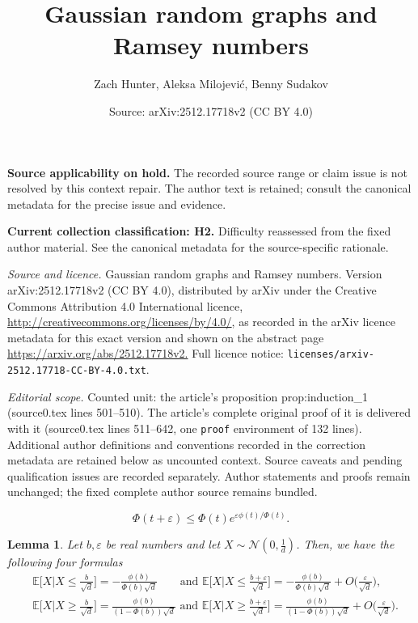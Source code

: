 \documentclass[10pt,a4paper]{amsart}
\title{\vspace{-0.9cm} Gaussian random graphs and Ramsey numbers}
\author{Zach Hunter, Aleksa Milojevi\'c, Benny Sudakov}
\date{Source: arXiv:2512.17718v2 (CC BY 4.0)}
\newtheorem{lemma}{Lemma}
\def\bE{\mathbb{E}}
\def\cN{\mathcal{N}}
\def\eps{\varepsilon}
\begin{document}
\maketitle
\par\medskip\noindent\textbf{Source applicability on hold.} The recorded source range or claim issue is not resolved by this context repair. The author text is retained; consult the canonical metadata for the precise issue and evidence.\par\medskip

\par\medskip\noindent\textbf{Current collection classification: H2.} Difficulty reassessed from the fixed author material. See the canonical metadata for the source-specific rationale.\par\medskip


{\sloppy \noindent\emph{Source and licence.} Gaussian random graphs and Ramsey numbers. Version arXiv:2512.17718v2 (CC BY 4.0), distributed by arXiv under the Creative Commons Attribution 4.0 International licence, \url{http://creativecommons.org/licenses/by/4.0/}, as recorded in the arXiv licence metadata for this exact version and shown on the abstract page \url{https://arxiv.org/abs/2512.17718v2.} Full licence notice: \texttt{licenses/arxiv-2512.17718-CC-BY-4.0.txt}.\par\smallskip\par}

\noindent\textit{Editorial scope.} Counted unit: the article's proposition prop:induction\_1 (source0.tex lines 501--510). The article's complete original proof of it is delivered with it (source0.tex lines 511--642, one \texttt{proof} environment of 132 lines). Additional author definitions and conventions recorded in the correction metadata are retained below as uncounted context. Source caveats and pending qualification issues are recorded separately. Author statements and proofs remain unchanged; the fixed complete author source remains bundled.\par\medskip
\begin{equation}\label{eqn:log_concavity}
    \Phi(t+\eps)\leq \Phi(t)e^{\eps\phi(t)/\Phi(t)}.
\end{equation}

\begin{lemma}\label{lemma:truncated_expectation}
Let $b, \eps$ be real numbers and let $X\sim \cN(0, \frac{1}{d})$. Then, we have the following four formulas
{\smaller[0.3]
\begin{align*}
    &\bE\bigg[X\Big| X\leq \frac{b}{\sqrt{d}}\bigg]=-\frac{\phi(b)}{\Phi(b)\sqrt{d}} \quad \,\,\,\,\text{ and }\bE\bigg[X\Big| X\leq \frac{b+\eps}{\sqrt{d}}\bigg]=-\frac{\phi(b)}{\Phi(b)\sqrt{d}}+O\bigg(\frac{\eps}{\sqrt{d}}\bigg),\\
    &\bE\bigg[X\Big| X\geq \frac{b}{\sqrt{d}}\bigg]=\frac{\phi(b)}{(1-\Phi(b))\sqrt{d}}\text{ and } \bE\bigg[X\Big| X\geq \frac{b+\eps}{\sqrt{d}}\bigg]=\frac{\phi(b)}{(1-\Phi(b))\sqrt{d}}+O\bigg(\frac{\eps}{\sqrt{d}}\bigg).
\end{align*}
}
\end{lemma}
\end{document}
